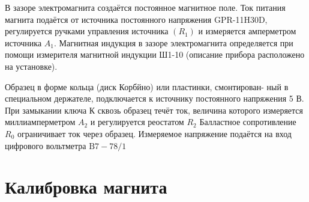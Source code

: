 \documentclass[a4paper]{article}
\begin{document}
В зазоре электромагнита создаётся постоянное магнитное поле. Ток питания магнита подаётся от источника постоянного напряжения GPR-11H30D, регулируется ручками управления источника $\left(R_{1}\right)$ и измеряется амперметром источника $A_{1}$. Магнитная индукция в зазоре электромагнита определяется при помощи измерителя магнитной индукции Ш1-10 (описание прибора расположено на установке).

Образец в форме кольца (диск Корбйно) или пластинки, смонтирован-
ный в специальном держателе, подключается к источнику постоянного напряжения 5 В. При замыкании ключа К сквозь образец течёт ток, величина которого измеряется миллиамперметром $A_{2}$ и регулируется реостатом $R_{2}$ Балластное сопротивление $R_{0}$ ограничивает ток через образец. Измеряемое напряжение подаётся на вход цифрового вольтметра $\mathrm{B} 7-78 / 1$

\newpage

\section{Калибровка магнита}
\end{document}
